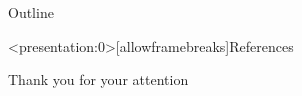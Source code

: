 \documentclass[aspectratio=169,xcolor=dvipsnames]{beamer}
\begin{document}
    

    \begin{frame}{Outline}
        \tableofcontents
    \end{frame}

    

    \begin{frame}<presentation:0>[allowframebreaks]{References}
        
    \end{frame}

    \begin{frame}
        \Huge{\centerline{Thank you for your attention}}
    \end{frame}
\end{document}
